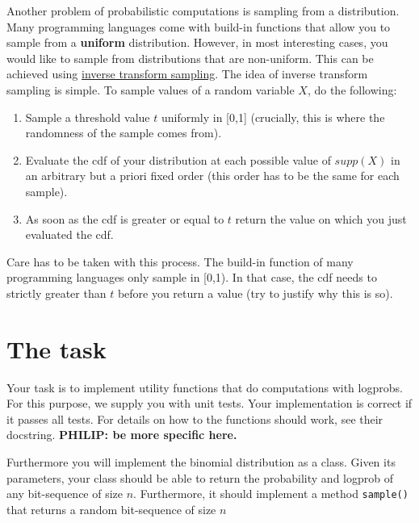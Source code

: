 \documentclass[11pt, leqno, a4paper]{article}
\begin{document}
Another problem of probabilistic computations is sampling from a distribution. Many programming languages
come with build-in functions that allow you to sample from a \textbf{uniform} distribution. However,
in most interesting cases, you would like to sample from distributions that are non-uniform. This can
be achieved using 
\href{https://en.wikipedia.org/wiki/Inverse_transform_sampling}{inverse transform sampling}. The idea of 
inverse transform sampling is simple. To sample values of a random variable $ X $, do the following:
\begin{enumerate}
\item Sample a threshold value $ t $ uniformly in [0,1] (crucially, this is where the randomness of the 
sample comes from).
\item Evaluate the cdf of your distribution at each possible value of $ supp(X) $ in an arbitrary but a 
priori fixed order (this order has to be the same for each sample).
\item As soon as the cdf is greater or equal to $ t $ return the value on which you just evaluated the cdf.
\end{enumerate}

Care has to be taken with this process. The build-in function of many programming languages only
sample in [0,1). In that case, the cdf needs to strictly greater than $ t $ before you return a value (try
to justify why this is so).

\section{The task}
Your task is to implement utility functions that do computations with logprobs. For this purpose, we
supply you with unit tests. Your implementation is correct if it passes all tests. For details on
how to the functions should work, see their docstring. \textbf{PHILIP: be more specific here.}

Furthermore you will implement the binomial distribution as a class. Given its parameters, your
class should be able to return the probability and logprob of any bit-sequence of size $ n $. Furthermore,
it should implement a method \texttt{sample()} that returns a random bit-sequence of size $ n $ 
\end{document}
